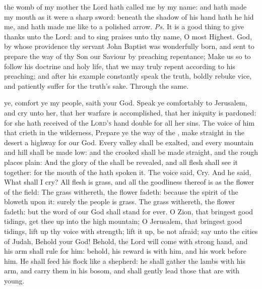 \introit
{} the womb of my mother the Lord hath called me by my name: and hath made my mouth as it were a sharp sword: beneath the shadow of his hand hath he hid me, and hath made me like to a polished arrow. \textit{Ps.} It is a good thing to give thanks unto the Lord: and to sing praises unto thy name, O most Highest.
\collect
\label{JohnCollect}
 God, by whose providence thy servant John Baptist was wonderfully born, and sent to prepare the way of thy Son our Saviour by preaching repentance; Make us so to follow his doctrine and holy life, that we may truly repent according to his preaching; and after his example constantly speak the truth, boldly rebuke vice, and patiently suffer for the truth's sake. Through the same.

 ye, comfort ye my people, saith your God. Speak ye comfortably to Jerusalem, and cry unto her, that her warfare is accomplished, that her iniquity is pardoned: for she hath received of the {\textsc{Lord's}} hand double for all her sins. The voice of him that crieth in the wilderness, Prepare ye the way of the , make straight in the desert a highway for our God. Every valley shall be exalted, and every mountain and hill shall be made low: and the crooked shall be made straight, and the rough places plain: And the glory of the  shall be revealed, and all flesh shall see it together: for the mouth of the  hath spoken it. The voice said, Cry. And he said, What shall I cry? All flesh is grass, and all the goodliness thereof is as the flower of the field: The grass withereth, the flower fadeth: because the spirit of the  bloweth upon it: surely the people is grass. The grass withereth, the flower fadeth: but the word of our God shall stand for ever. O Zion, that bringest good tidings, get thee up into the high mountain; O Jerusalem, that bringest good tidings, lift up thy voice with strength; lift it up, be not afraid; say unto the cities of Judah, Behold your God! Behold, the Lord  will come with strong hand, and his arm shall rule for him: behold, his reward is with him, and his work before him. He shall feed his flock like a shepherd: he shall gather the lambs with his arm, and carry them in his bosom, and shall gently lead those that are with young.


